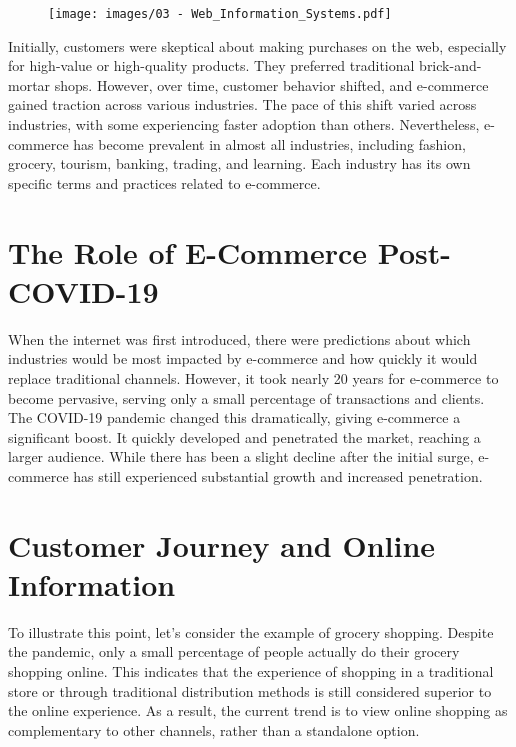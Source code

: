 \begin{figure}[!h]
  \centering
  \texttt{[image: images/03 - Web\_Information\_Systems.pdf]}
\end{figure}

Initially, customers were skeptical about making purchases on the web,
especially for high-value or high-quality products. They preferred
traditional brick-and-mortar shops. However, over time, customer
behavior shifted, and e-commerce gained traction across various
industries. The pace of this shift varied across industries, with some
experiencing faster adoption than others. Nevertheless, e-commerce has
become prevalent in almost all industries, including fashion, grocery,
tourism, banking, trading, and learning. Each industry has its own
specific terms and practices related to e-commerce.

\section{The Role of E-Commerce
  Post-COVID-19}\label{the-role-of-e-commerce-post-covid-19}

When the internet was first introduced, there were predictions about
which industries would be most impacted by e-commerce and how quickly it
would replace traditional channels. However, it took nearly 20 years for
e-commerce to become pervasive, serving only a small percentage of
transactions and clients. The COVID-19 pandemic changed this
dramatically, giving e-commerce a significant boost. It quickly
developed and penetrated the market, reaching a larger audience. While
there has been a slight decline after the initial surge, e-commerce has
still experienced substantial growth and increased penetration.

\section{Customer Journey and Online
  Information}\label{customer-journey-and-online-information}

To illustrate this point, let's consider the example of grocery
shopping. Despite the pandemic, only a small percentage of people
actually do their grocery shopping online. This indicates that the
experience of shopping in a traditional store or through traditional
distribution methods is still considered superior to the online
experience. As a result, the current trend is to view online shopping as
complementary to other channels, rather than a standalone option.

